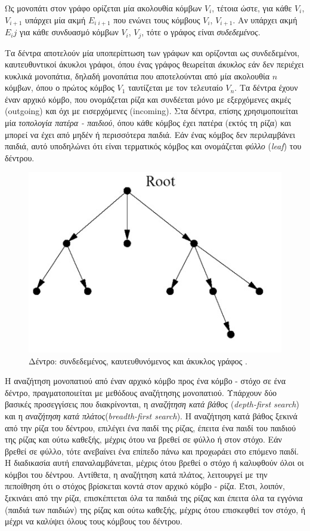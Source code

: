 \bigskip
Ως μονοπάτι στον γράφο ορίζεται μία ακολουθία κόμβων $V_i$, τέτοια ώστε, για κάθε $V_i$, $V_{i+1}$ υπάρχει μία ακμή $E_{i\;i+1}$ που ενώνει τους κόμβους $V_i$, $V_{i+1}$. Αν υπάρχει ακμή $E_ij$ για κάθε συνδυασμό κόμβων $V_i$, $V_j$, τότε ο γράφος είναι \textit{συδεδεμένος}.

\bigskip 
Τα δέντρα αποτελούν μία υποπερίπτωση των γράφων και ορίζονται ως συνδεδεμένοι, καυτευθυντικοί άκυκλοι γράφοι, όπου ένας γράφος θεωρείται \textit{άκυκλος} εάν δεν περιέχει κυκλικά μονοπάτια, δηλαδή μονοπάτια που αποτελούνται από μία ακολουθία $n$ κόμβων, όπου ο πρώτος κόμβος $V_1$ ταυτίζεται με τον τελευταίο $V_n$. Τα δέντρα έχουν έναν αρχικό κόμβο, που ονομάζεται ρίζα και συνδέεται μόνο με εξερχόμενες ακμές (outgoing) και όχι με εισερχόμενες (incoming). Στα δέντρα, επίσης χρησιμοποιείται μία \textit{τοπολογία πατέρα - παιδιού}, όπου κάθε κόμβος έχει πατέρα (εκτός τη ρίζα) και μπορεί να έχει από μηδέν ή περισσότερα παιδιά. Εάν ένας κόμβος δεν περιλαμβάνει παιδιά, αυτό υποδηλώνει ότι είναι τερματικός κόμβος και ονομάζεται \textit{φύλλο} (\textit{leaf}) του δέντρου.

\begin{figure}[!ht]
	\centering
	\includegraphics[width=0.3\linewidth]{Chapters/Chapter3/Figures/tree.png}
	\caption[Δέντρο: συνδεδεμένος, καυτευθυνόμενος και άκυκλος γράφος.]{Δέντρο: συνδεδεμένος, καυτευθυνόμενος και άκυκλος γράφος \cite{principles_of_robot_motion}.}
	\label{fig:tree}
\end{figure}


\bigskip
Η αναζήτηση μονοπατιού από έναν αρχικό κόμβο προς ένα κόμβο - στόχο σε ένα δέντρο, πραγματοποιείται με μεθόδους αναζήτησης μονοπατιού. Υπάρχουν δύο βασικές προσεγγίσεις που διακρίνονται, η \textit{αναζήτηση κατά βάθος} (\textit{depth-first search}) και η \textit{αναζήτηση κατά πλάτος}(\textit{breadth-first search}). Η αναζήτηση κατά βάθος ξεκινά από την ρίζα του δέντρου, επιλέγει ένα παιδί της ρίζας, έπειτα ένα παιδί του παιδιού της ρίζας και ούτω καθεξής, μέχρις ότου να βρεθεί σε φύλλο ή στον στόχο. Εάν βρεθεί σε φύλλο, τότε ανεβαίνει ένα επίπεδο πάνω και προχωράει στο επόμενο παιδί. Η διαδικασία αυτή επαναλαμβάνεται, μέχρις ότου βρεθεί ο στόχο ή καλυφθούν όλοι οι κόμβοι του δέντρου. Αντίθετα, η  αναζήτηση κατά πλάτος, λειτουργεί με την πεποίθηση ότι ο στόχος βρίσκεται κοντά στον αρχικό κόμβο - ρίζα. Έτσι, λοιπόν, ξεκινάει από την ρίζα, επισκέπτεται όλα τα παιδιά της ρίζας και έπειτα όλα τα εγγόνια (παιδιά των παιδιών) της ρίζας και ούτω καθεξής, μέχρις ότου επισκεφθεί τον στόχο, ή μέχρι να καλύψει όλους τους κόμβους του δέντρου.

